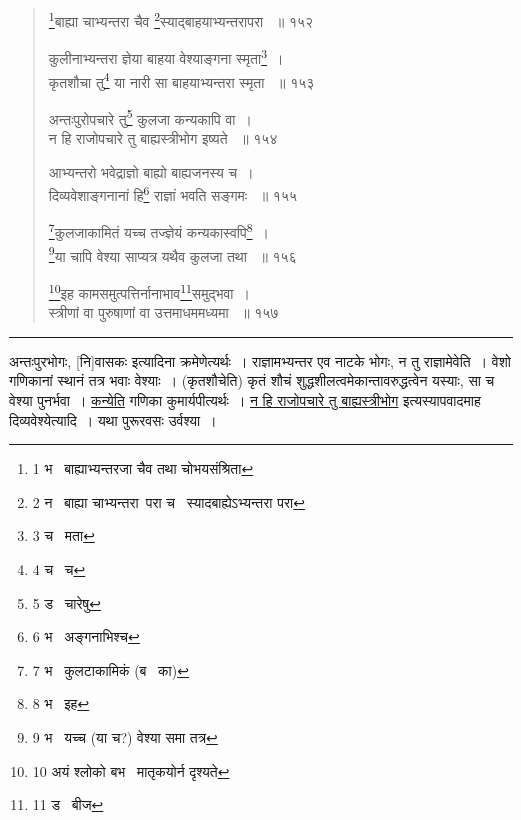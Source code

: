 \documentclass[11pt, openany]{book}
\begin{document}
{\newpage

\begin{quote}
 {\na \renewcommand{\thefootnote}{1}\footnote{1 भ \textendash\ बाह्याभ्यन्तरजा चैव तथा चोभयसंश्रिता }बाह्या चाभ्यन्तरा चैव \renewcommand{\thefootnote}{2}\footnote{2 न \textendash\ बाह्या चाभ्यन्तरा\textendash\ परा च \textendash\ स्यादबाह्येऽभ्यन्तरा परा }स्याद्बाहयाभ्यन्तरापरा ~॥ १५२ 

कुलीनाभ्यन्तरा ज्ञेया बाहया वेश्याङ्गना स्मृता\renewcommand{\thefootnote}{3}\footnote{3 च \textendash\ मता }~। \\
कृतशौचा तु\renewcommand{\thefootnote}{4}\footnote{4 च \textendash\ च } या नारी सा बाहयाभ्यन्तरा स्मृता ~॥ १५३ 

अन्तःपुरोपचारे तु\renewcommand{\thefootnote}{5}\footnote{5 ड \textendash\ चारेषु} कुलजा कन्यकापि वा~।\\ 
न हि राजोपचारे तु बाह्यस्त्रीभोग इष्यते ~॥ १५४ 

आभ्यन्तरो भवेद्राज्ञो बाह्यो बाह्यजनस्य च~। \\
दिव्यवेशाङ्गनानां हि\renewcommand{\thefootnote}{6}\footnote{6 भ \textendash\ अङ्गनाभिश्च} राज्ञां भवति सङ्गमः ~॥ १५५ 

\renewcommand{\thefootnote}{7}\footnote{7 भ \textendash\ कुलटाकामिकं (ब \textendash\ का)}कुलजाकामितं यच्च तज्ज्ञेयं कन्यकास्वपि\renewcommand{\thefootnote}{8}\footnote{8 भ \textendash\ इह }~।\\ 
\renewcommand{\thefootnote}{9}\footnote{9 भ \textendash\ यच्च (या च?) वेश्या समा तत्र}या चापि वेश्या साप्यत्र यथैव कुलजा तथा ~॥ १५६ 

\renewcommand{\thefootnote}{10}\footnote{10 अयं श्लोको बभ \textendash\ मातृकयोर्न दृश्यते}इह कामसमुत्पत्तिर्नानाभाव\renewcommand{\thefootnote}{11}\footnote{11 ड \textendash\ बीज }समुद्भवा~।\\ 
स्त्रीणां वा पुरुषाणां वा उत्तमाधममध्यमा ~॥ १५७ }
\end{quote}

\hrule

\vspace{2mm}

\noindent
अन्तःपुरभोगः, [नि]वासकः इत्यादिना क्रमेणेत्यर्थः~। राज्ञामभ्यन्तर
एव नाटके भोगः, न तु राज्ञामेवेति~। वेशो गणिकानां स्थानं तत्र भवाः
वेश्याः~। (कृतशौचेति) कृतं शौचं शुद्धशीलत्वमेकान्तावरुद्धत्वेन यस्याः,
सा च वेश्या पुनर्भवा~। \underline{कन्येति} गणिका कुमार्यपीत्यर्थः~। \underline{न हि
राजोपचारे तु बाह्यस्त्रीभोग} इत्यस्यापवादमाह दिव्यवेश्येत्यादि~। यथा
पुरूरवसः उर्वश्या~। 

\newpage

}
\end{document}
